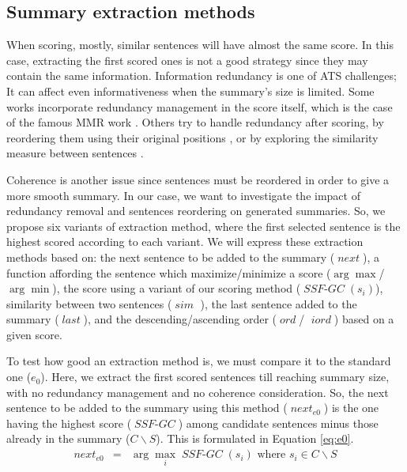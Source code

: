 \documentclass[12pt, oneside, a4paper]{article}
\DeclareMathOperator{\ssfgc}{\textit{SSF-GC}}
\DeclareMathOperator{\ord}{\textit{ord}}
\DeclareMathOperator{\iord}{\textit{iord}}
\DeclareMathOperator{\simil}{\textit{sim}}
\DeclareMathOperator{\nextsent}{\textit{next}}
\DeclareMathOperator{\lastsent}{\textit{last}}
\begin{document}
\subsection{Summary extraction methods}

When scoring, mostly, similar sentences will have almost the same score. 
In this case, extracting the first scored ones is not a good strategy since they may contain the same information. 
Information redundancy is one of ATS challenges; It can affect even informativeness when the summary's size is limited.
Some works incorporate redundancy management in the score itself, which is the case of the famous MMR work \citep{98-carbonell-goldstein}. 
Others try to handle redundancy after scoring, by reordering them using their original positions \citep{99-mckeown-al,00-radev-al,02-lin-hovy}, or by exploring the similarity measure between sentences \citep{15-aries-al}.

Coherence is another issue since sentences must be reordered in order to give a more smooth summary. 
In our case, we want to investigate the impact of redundancy removal and sentences reordering on generated summaries. 
So, we propose six variants of extraction method, where the first selected sentence is the highest scored according to each variant.
We will express these extraction methods based on: the next sentence to be added to the summary ($ \nextsent $), a function affording the sentence which maximize/minimize a score ($ \arg\max $/$ \arg\min $), the score using a variant of our scoring method ($\ssfgc(s_i) $), similarity between two sentences ($ \simil $ ), the last sentence added to the summary ($ \lastsent $), and the descending/ascending order ($ \ord $/ $ \iord $) based on a given score.

To test how good an extraction method is, we must compare it to the standard one  ($ e_0 $).
Here, we extract the first scored sentences till reaching summary size, with no redundancy management and no coherence consideration.
So, the next sentence to be added to the summary using this method ($\nextsent_{e0}$) is the one having the highest score ($ \ssfgc $) among candidate sentences minus those already in the summary ($ C\backslash S $).
This is formulated in Equation \ref{eq:e0}. 
\begin{equation}
\begin{aligned}
\nextsent_{e0} & = & \arg\max\limits_i \ssfgc(s_i) 
\text{ where } s_i \in C\backslash S \\
\end{aligned}
\label{eq:e0}
\end{equation}
\end{document}
